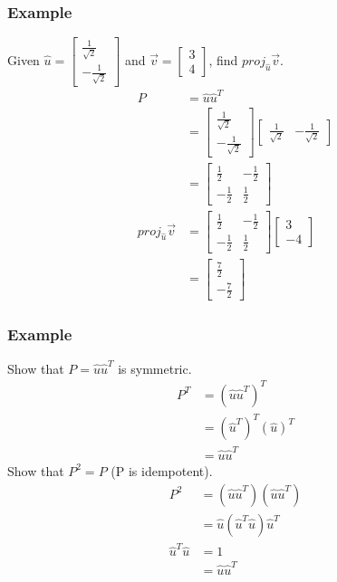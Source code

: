 \documentclass{math}
\begin{document}
\subsubsection*{Example}
Given \( \hat{u} = \begin{bmatrix}\frac{1}{\sqrt{2}} \\
-\frac{1}{\sqrt{2}}\end{bmatrix} \) and \( \vec{v} = \begin{bmatrix}3 \\
4\end{bmatrix} \), find \( proj_{\hat{u}}\vec{v} \).
\begin{align*}
  P &= \hat{u}\hat{u}^T \\
  &= \begin{bmatrix}
    \frac{1}{\sqrt{2}} \\ -\frac{1}{\sqrt{2}}
  \end{bmatrix}\begin{bmatrix}
    \frac{1}{\sqrt{2}} & -\frac{1}{\sqrt{2}}
  \end{bmatrix} \\
  &= \begin{bmatrix}
    \frac{1}{2} & -\frac{1}{2} \\
    -\frac{1}{2} & \frac{1}{2}
  \end{bmatrix} \\
  proj_{\hat{u}}\vec{v} &= \begin{bmatrix}
    \frac{1}{2} & -\frac{1}{2} \\
    -\frac{1}{2} & \frac{1}{2}
  \end{bmatrix}\begin{bmatrix}
    3 \\ -4
  \end{bmatrix} \\
  &= \begin{bmatrix}
    \frac{7}{2} \\ -\frac{7}{2}
  \end{bmatrix}
\end{align*}

\subsubsection*{Example}
Show that \( P = \hat{u}\hat{u}^T \) is symmetric.
\begin{align*}
  P^T &= (\hat{u}\hat{u}^T)^T \\
  &= (\hat{u}^T)^T(\hat{u})^T \\
  &= \hat{u}\hat{u}^T
\end{align*}
Show that \( P^2 = P \) (P is idempotent).
\begin{align*}
  P^2 &= (\hat{u}\hat{u}^T)(\hat{u}\hat{u}^T) \\
  &= \hat{u}(\hat{u}^T\hat{u})\hat{u}^T \\
  \hat{u}^T\hat{u} &= 1 \\
  &= \hat{u}\hat{u}^T
\end{align*}
\end{document}
